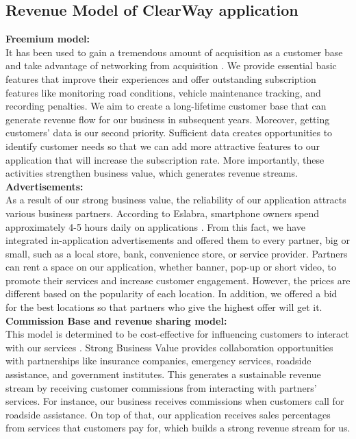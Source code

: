\documentclass[12pt,a4paper]{article}
\begin{document}
\subsection{Revenue Model of ClearWay application}
\noindent \textbf{Freemium model:} \\
\noindent It has been used to gain a tremendous amount of acquisition as a customer base and take advantage of networking from acquisition \citep{task_5.1}. We provide essential basic features that improve their experiences and offer outstanding subscription features like monitoring road conditions, vehicle maintenance tracking, and recording penalties. We aim to create a long-lifetime customer base that can generate revenue flow for our business in subsequent years. Moreover, getting customers' data is our second priority. Sufficient data creates opportunities to identify customer needs so that we can add more attractive features to our application that will increase the subscription rate. More importantly, these activities strengthen business value, which generates revenue streams.\\

\noindent \textbf{Advertisements:} \\
\noindent As a result of our strong business value, the reliability of our application attracts various business partners. According to Eslabra, smartphone owners spend approximately 4-5 hours daily on applications \citep{task_5.2}. From this fact, we have integrated in-application advertisements and offered them to every partner, big or small, such as a local store, bank, convenience store, or service provider. Partners can rent a space on our application, whether banner, pop-up or short video, to promote their services and increase customer engagement. However, the prices are different based on the popularity of each location. In addition, we offered a bid for the best locations so that partners who give the highest offer will get it. \\

\noindent \textbf{Commission Base and revenue sharing model:} \\
\noindent This model is determined to be cost-effective for influencing customers to interact with our services \citep{task_5.3}. Strong Business Value provides collaboration opportunities with partnerships like insurance companies, emergency services, roadside assistance, and government institutes. This generates a sustainable revenue stream by receiving customer commissions from interacting with partners' services. For instance, our business receives commissions when customers call for roadside assistance. On top of that, our application receives sales percentages from services that customers pay for, which builds a strong revenue stream for us. \\
\end{document}
